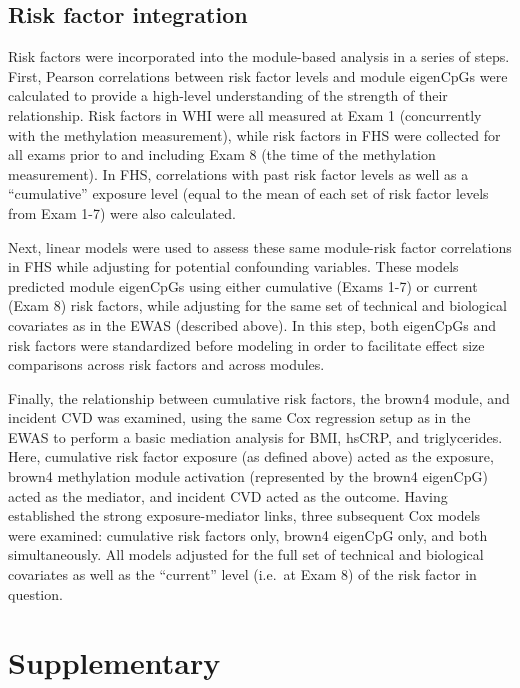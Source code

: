\documentclass[]{article}
\theoremstyle{definition}
\theoremstyle{definition}
\theoremstyle{definition}
\theoremstyle{remark}
\begin{document}
\subsection{Risk factor integration}\label{risk-factor-integration}

Risk factors were incorporated into the module-based analysis in a
series of steps. First, Pearson correlations between risk factor levels
and module eigenCpGs were calculated to provide a high-level
understanding of the strength of their relationship. Risk factors in WHI
were all measured at Exam 1 (concurrently with the methylation
measurement), while risk factors in FHS were collected for all exams
prior to and including Exam 8 (the time of the methylation measurement).
In FHS, correlations with past risk factor levels as well as a
``cumulative'' exposure level (equal to the mean of each set of risk
factor levels from Exam 1-7) were also calculated.

Next, linear models were used to assess these same module-risk factor
correlations in FHS while adjusting for potential confounding variables.
These models predicted module eigenCpGs using either cumulative (Exams
1-7) or current (Exam 8) risk factors, while adjusting for the same set
of technical and biological covariates as in the EWAS (described above).
In this step, both eigenCpGs and risk factors were standardized before
modeling in order to facilitate effect size comparisons across risk
factors and across modules.

Finally, the relationship between cumulative risk factors, the brown4
module, and incident CVD was examined, using the same Cox regression
setup as in the EWAS to perform a basic mediation analysis for BMI,
hsCRP, and triglycerides. Here, cumulative risk factor exposure (as
defined above) acted as the exposure, brown4 methylation module
activation (represented by the brown4 eigenCpG) acted as the mediator,
and incident CVD acted as the outcome. Having established the strong
exposure-mediator links, three subsequent Cox models were examined:
cumulative risk factors only, brown4 eigenCpG only, and both
simultaneously. All models adjusted for the full set of technical and
biological covariates as well as the ``current'' level (i.e.~at Exam 8)
of the risk factor in question.

\section{Supplementary}\label{supplementary}
\end{document}
